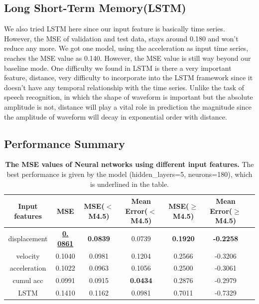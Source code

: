 \documentclass{article} %
\begin{document}
\subsection{Long Short-Term Memory(LSTM)}
We also tried LSTM here since our input feature is basically time series. However, the MSE of validation and test data, stays around 0.180 and won't reduce any more. We got one model, using the acceleration as input time series, reaches the MSE value as 0.140. However, the MSE value is still way beyond our baseline mode. One difficulty we found in LSTM is there a very important feature, distance, very difficulty to incorporate into the LSTM framework since it doesn't have any temporal relationship with the time series. Unlike the task of speech recognition, in which the shape of waveform is important but the absolute amplitude is not, distance will play a vital role in prediction the magnitude since the amplitude of  waveform will decay in exponential order with distance.


\subsection{Performance Summary}

\begin{table}[htbp]
	\small
	\centering
	\begin{tabular}{@{}|c|c|c|c|c|c|c|@{}} %
		\hline
		\cline{2-6}
		Input features & MSE & MSE($<$M4.5) & Mean Error($<$M4.5)& MSE($\geq$M4.5) & Mean Error($\geq$M4.5)\\ 
		\cline{2-6} \hline \hline
		displacement & \textbf{\underline{0. 0861}} & \textbf{0.0839} & 0.0739 & \textbf{0.1920}  & \textbf{-0.2258} \\
		 velocity & 0.1040  &  0.0981 & 0.1204 & 0.2566 & -0.3206\\ 
		acceleration &  0.1022 & 0.0963 & 0.1056 & 0.2500 & -0.3061 \\ 
		 cumul acc & 0.0991 & 0.0915 & \textbf{0.0434} & 0.2876  & -0.2979 \\ 
		 LSTM & 0.1410 & 0.1162 & 0.0981 & 0.7011 & -0.7329 \\
		 \hline
	\end{tabular}
	\caption{{\bf The MSE values of Neural networks using different input features.} The best performance is given by the model (hidden\_layers=5, neurons=180), which is underlined in the table.}
	\label{tab:nn_perf}
\end{table}
\end{document}
